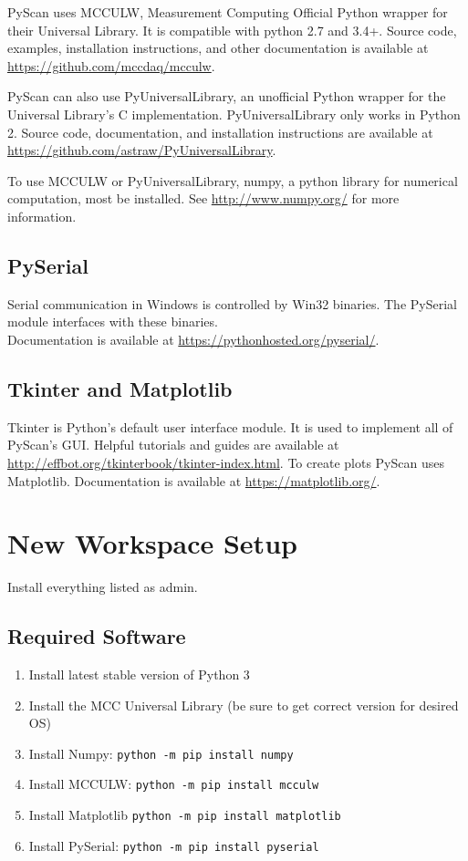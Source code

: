 \documentclass[11pt]{article}
\begin{document}
PyScan uses MCCULW, Measurement Computing Official Python wrapper for their Universal Library. It is compatible with python 2.7 and 3.4+. Source code, examples, installation instructions, and other documentation is available at \url{https://github.com/mccdaq/mcculw}.

PyScan can also use PyUniversalLibrary, an unofficial Python wrapper for the Universal Library's C implementation. PyUniversalLibrary only works in Python 2. Source code, documentation, and installation instructions are available at \url{https://github.com/astraw/PyUniversalLibrary}.

To use MCCULW or PyUniversalLibrary, numpy, a python library for numerical computation, most be installed. See \url{http://www.numpy.org/} for more information.
\subsection{PySerial}
Serial communication in Windows is controlled by Win32 binaries. The PySerial module interfaces with these binaries.
\\ Documentation is available at \url{https://pythonhosted.org/pyserial/}.
\subsection{Tkinter and Matplotlib}
Tkinter is Python's default user interface module. It is used to implement all of PyScan's GUI. Helpful tutorials and guides are available at \url{http://effbot.org/tkinterbook/tkinter-index.html}. 
To create plots PyScan uses Matplotlib.
Documentation is available at \url{https://matplotlib.org/}.
\section{New Workspace Setup}
Install everything listed as admin.
\subsection{Required Software}
\begin{enumerate}
    \item Install latest stable version of Python 3
    \item Install the MCC Universal Library (be sure to get correct version for desired OS)
    \item Install Numpy: \texttt{python -m pip install numpy}
    \item Install MCCULW:  \texttt{python -m pip install mcculw}
    \item Install Matplotlib \texttt{python -m pip install matplotlib}
    \item Install PySerial: \texttt{python -m pip install pyserial}
\end{enumerate}
\end{document}
